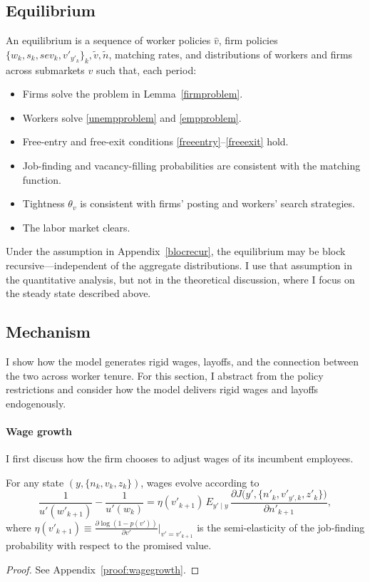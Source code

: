 \subsection{Equilibrium}
An equilibrium is a sequence of worker policies $
\hat{v}$, firm policies $\{w_k,s_k,sev_k,v'_{y'_k}\}_{k},\tilde{v},\tilde{n}$, matching rates, and distributions of workers and firms across submarkets $v$ such that, each period:
\begin{itemize}
\item Firms solve the problem in Lemma~\ref{firmproblem}.
\item Workers solve \eqref{unempproblem} and \eqref{empproblem}.
\item Free-entry and free-exit conditions \eqref{freeentry}–\eqref{freeexit} hold.
\item Job-finding and vacancy-filling probabilities are consistent with the matching function.
\item Tightness $\theta_v$ is consistent with firms’ posting and workers’ search strategies.
\item The labor market clears.
\end{itemize}
Under the assumption in Appendix~\ref{blocrecur}, the equilibrium may be block recursive—independent of the aggregate distributions. I use that assumption in the quantitative analysis, but not in the theoretical discussion, where I focus on the steady state described above.

\subsection{Mechanism}
I show how the model generates rigid wages, layoffs, and the connection between the two across worker tenure. For this section, I abstract from the policy restrictions and consider how the model delivers rigid wages and layoffs endogenously.

\paragraph{Wage growth}
I first discuss how the firm chooses to adjust wages of its incumbent employees.
\begin{proposition}\label{prop:wagegrowth}
For any state $(y,\{n_k,v_k,z_k\})$, wages evolve according to
\begin{equation} \label{eq:euler_prop}
\frac{1}{u'(w'_{k+1})}-\frac{1}{u'(w_k)}
=\eta(v'_{k+1})\,E_{y'\mid y}\,\frac{\partial J\big(y',\{n'_k,v'_{y',k},z'_k\}\big)}{\partial n'_{k+1}},
\end{equation}
where $\eta(v'_{k+1})\equiv \frac{\partial \log(1-p(v'))}{\partial v'}\big|_{v'=v'_{k+1}}$ is the semi-elasticity of the job-finding probability with respect to the promised value.
\end{proposition}
\begin{proof}
See Appendix~\ref{proof:wagegrowth}.
\end{proof}

